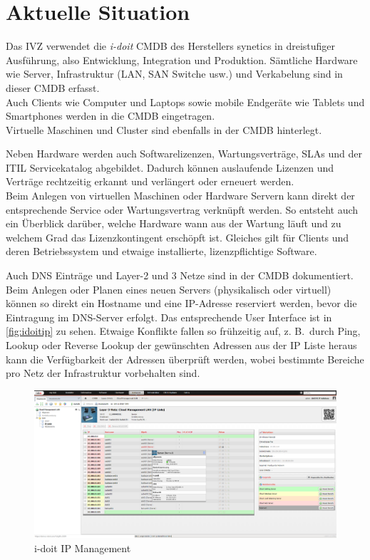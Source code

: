 \newpage
\section{Aktuelle Situation}
Das \acs{IVZ} verwendet die \textit{i-doit} \acs{CMDB} des Herstellers synetics in dreistufiger Ausführung, also Entwicklung, Integration und Produktion.
Sämtliche Hardware wie Server, Infrastruktur (\acf{LAN}, \acf{SAN} Switche usw.) und Verkabelung sind in dieser \acs{CMDB} erfasst.\\
Auch Clients wie Computer und Laptops sowie mobile Endgeräte wie Tablets und Smartphones werden in die \acs{CMDB} eingetragen.\\
Virtuelle Maschinen und Cluster sind ebenfalls in der \acs{CMDB} hinterlegt.

Neben Hardware werden auch Softwarelizenzen, Wartungsverträge, \acfp{SLA} und der \acf{ITIL} Servicekatalog abgebildet. Dadurch können auslaufende Lizenzen und Verträge rechtzeitig erkannt und verlängert oder erneuert werden.\\
Beim Anlegen von virtuellen Maschinen oder Hardware Servern kann direkt der entsprechende Service oder Wartungsvertrag verknüpft werden. So entsteht auch ein Überblick darüber, welche Hardware wann aus der Wartung läuft und zu welchem Grad das Lizenzkontingent erschöpft ist. Gleiches gilt für Clients und deren Betriebssystem und etwaige installierte, lizenzpflichtige Software.

Auch \acf{DNS} Einträge und Layer-2 und 3 Netze sind in der \acs{CMDB} dokumentiert. Beim Anlegen oder Planen eines neuen Servers (physikalisch oder virtuell) können so direkt ein Hostname und eine IP-Adresse reserviert werden, bevor die Eintragung im \acs{DNS}-Server erfolgt. Das entsprechende User Interface ist in \autoref{fig:idoitip} zu sehen. Etwaige Konflikte fallen so frühzeitig auf, z. B.~durch Ping, Lookup oder Reverse Lookup der gewünschten Adressen aus der IP Liste heraus kann die Verfügbarkeit der Adressen überprüft werden, wobei bestimmte Bereiche pro Netz der Infrastruktur vorbehalten sind.

\begin{figure}[H]
  \centering
  \includegraphics[width=\textwidth]{Anhang/idoitip}
  \caption{i-doit IP Management}
\label{fig:idoitip}
\end{figure}

